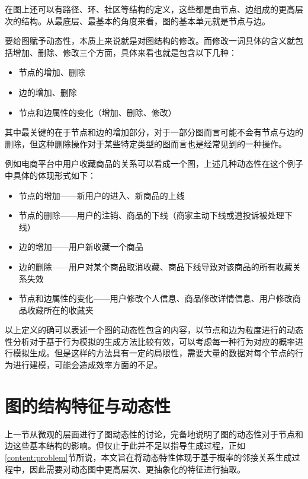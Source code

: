 \vspace{0.2cm}

在图上还可以有路径、环、社区等结构的定义，这些都是由节点、边组成的更高层次的结构。从最底层、最基本的角度来看，图的基本单元就是节点与边。

要给图赋予动态性，本质上来说就是对图结构的修改。而修改一词具体的含义就包括增加、删除、修改三个方面，具体来看也就是包含以下几种：

\begin{itemize}
    \item 节点的增加、删除
    \item 边的增加、删除
    \item 节点和边属性的变化（增加、删除、修改）
\end{itemize}

\vspace{0.2cm}

其中最关键的在于节点和边的增加部分，对于一部分图而言可能不会有节点与边的删除，但这种删除操作对于某些特定类型的图而言也是经常见到的一种操作。

例如电商平台中用户收藏商品的关系可以看成一个图，上述几种动态性在这个例子中具体的体现形式如下：

\begin{itemize}
    \item 节点的增加——新用户的进入、新商品的上线
    \item 节点的删除——用户的注销、商品的下线（商家主动下线或遭投诉被处理下线）
    \item 边的增加——用户新收藏一个商品
    \item 边的删除——用户对某个商品取消收藏、商品下线导致对该商品的所有收藏关系失效
    \item 节点和边属性的变化——用户修改个人信息、商品修改详情信息、用户修改商品收藏所在的收藏夹
\end{itemize}

\vspace{0.2cm}

以上定义的确可以表述一个图的动态性包含的内容，以节点和边为粒度进行的动态性分析对于基于行为模拟的生成方法比较有效，可以考虑每一种行为对应的概率进行模拟生成。但是这样的方法具有一定的局限性，需要大量的数据对每个节点的行为进行建模，可能会造成效率方面的不足。

\section{图的结构特征与动态性}
\label{cha:structure_dynamic}

上一节从微观的层面进行了图动态性的讨论，完备地说明了图的动态性对于节点和边这些基本结构的影响。但仅止于此并不足以指导生成过程，正如\ref{content:problem}节所说，本文旨在将动态特性体现于基于概率的邻接关系生成过程中，因此需要对动态图中更高层次、更抽象化的特征进行抽取。

